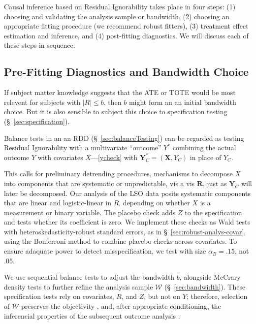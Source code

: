 Causal inference based on Residual Ignorability takes place
in four steps: (1) choosing and validating the analysis sample or
bandwidth, (2) choosing an appropriate fitting procedure (we recommend
robust fitters), (3) treatment effect estimation and inference, and
(4) post-fitting diagnostics.
We will discuss each of these steps in sequence.

\subsection{Pre-Fitting Diagnostics and Bandwidth Choice}
\label{sec:bandwidthChoice}

If subject matter knowledge suggests that the ATE or TOTE would be
most relevent for subjects with $|R|\le b$, then $b$ might form an an
initial bandwidth choice. But it
is also sensible to subject this choice to specification
testing (\S~\ref{sec:specification}).

Balance tests in an an RDD (\S~\ref{sec:balanceTesting})
can be regarded as testing Residual Ignorability with a multivariate
``outcome'' $Y^{*}$ combining the actual outcome $Y$ with covariates $X$---\eqref{ycheck} with
$\mathbf{Y}_{C}^{*} = (\mathbf{X}, {Y}_C)$ in place of $Y_{C}$.

This calls for preliminary detrending procedures, mechanisms to
decompose  $X$ into components that are systematic or unpredictable,
vis a vis $\mathbf{R}$, just as ${\mathbf{Y}_C}$ will later be decomposed.
Our analysis of the LSO data posits systematic components that are
linear and logistic-linear in $R$, depending on whether $X$ is
a measurement or binary variable. %
The placebo check adds $Z$ to the specification and tests whether its
coefficient is zero.  We implement these checks as Wald tests with
heteroskedasticity-robust standard errors, as in
\S~\ref{sec:robust-analys-covar}, using the Bonferroni method to
combine placebo checks across covariates.
To ensure adaquate power to detect misspecification,
we test with size $\alpha_{B}=.15$, not $.05$.

We use sequential balance tests to adjust the bandwidth $b$, alongside
McCrary density tests to further
refine the analysis sample $\mathcal{W}$ (\S~\ref{sec:bandwidth}).
These specification tests rely on covariates, $R$, and $Z$, but not on
$Y$; therefore, selection of $\mathcal{W}$ preserves the objectivity
\citep[c.f.][]{rubin2007design}, and, after appropriate conditioning,
the inferencial properties of the subsequent outcome analysis
\citep[e.g.][]{rosenbaum2002covariance}.

